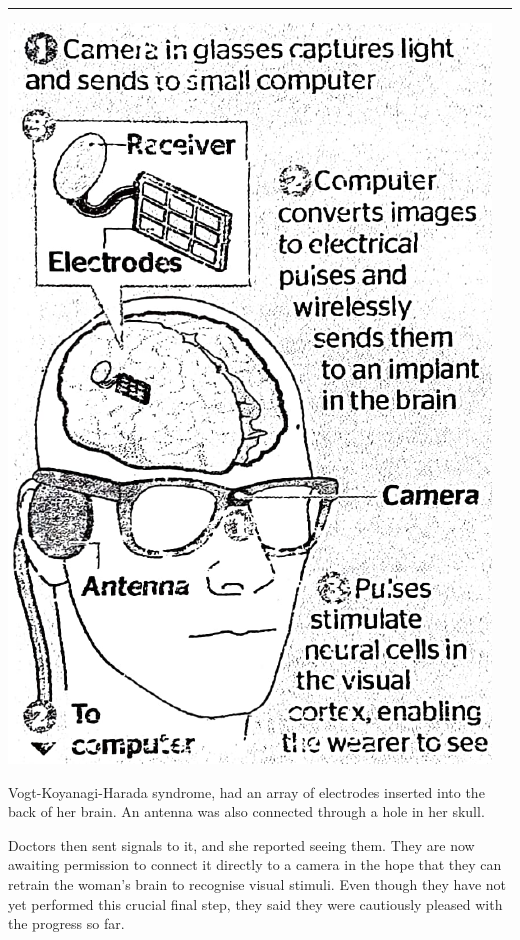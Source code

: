\documentclass[a4paper]{article}
\newcommand\Line[1][0ex]{%
  \vspace{#1}
  \noindent\rule{\columnwidth}{1px}%
}
\begin{document}
\begin{multicols}{3}
  \Line[-0.6ex]

  \noindent\includegraphics[width=\columnwidth]{./images/image.png}

  \noindent
  Vogt-Koyanagi-Harada syndrome, had an array of electrodes inserted into the
  back of her brain. An antenna was also connected through a hole in her skull.

  Doctors then sent signals to it, and she reported seeing them. They are now
  awaiting permission to connect it directly to a camera in the hope that they
  can retrain the woman's brain to recognise visual stimuli. Even though they
  have not yet performed this crucial final step, they said they were cautiously
  pleased with the progress so far.

  \columnbreak


\end{multicols}
\end{document}
